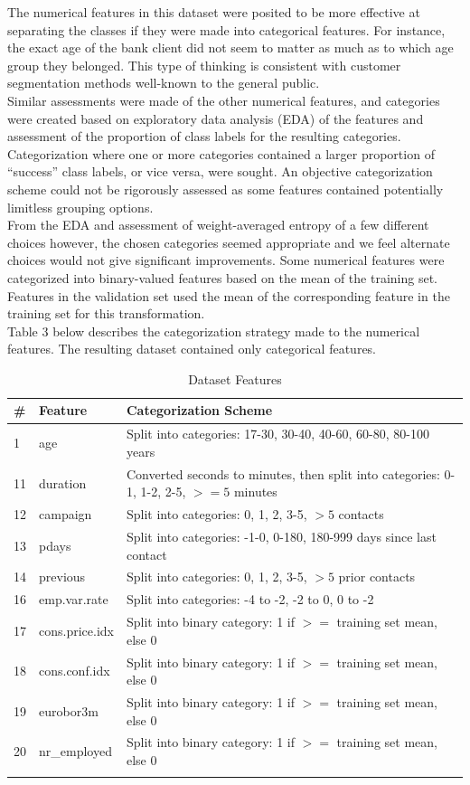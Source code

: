 \documentclass[11pt]{article}
\begin{document}
The numerical features in this dataset were posited to be more effective at separating the classes if they were made into categorical features. For instance, the exact age of the bank client did not seem to matter as much as to which age group they belonged. This type of thinking is consistent with customer segmentation methods well-known to the general public.  \\

Similar assessments were made of the other numerical features, and categories were created based on exploratory data analysis (EDA) of the features and assessment of the proportion of class labels for the resulting categories. Categorization where one or more categories contained a larger proportion of “success” class labels, or vice versa, were sought. An objective categorization scheme could not be rigorously assessed as some features contained potentially limitless grouping options.  \\

From the EDA and assessment of weight-averaged entropy of a few different choices however, the chosen categories seemed appropriate and we feel alternate choices would not give significant improvements. Some numerical features were categorized into binary-valued features based on the mean of the training set. Features in the validation set used the mean of the corresponding feature in the training set for this transformation. \\

Table 3 below describes the categorization strategy made to the numerical features. The resulting dataset contained only categorical features. 

\begin{table}[hbt!]
\centering
\caption{Dataset Features}
\begin{tabular}{lll}
\hline
\textbf{\#}& \textbf{Feature}& \textbf{Categorization Scheme}\\
\hline
1&age&Split into categories: 17-30, 30-40, 40-60, 60-80, 80-100 years \\
11&duration &Converted seconds to minutes, then split into categories: 0-1, 1-2, 2-5, $>=5$ minutes  \\
12&campaign  &Split into categories: 0, 1, 2, 3-5, $>5$ contacts \\
13&pdays &Split into categories: -1-0, 0-180, 180-999 days since last contact \\
14&previous  &Split into categories: 0, 1, 2, 3-5, $>5$ prior contacts \\
16&emp.var.rate &Split into categories: -4 to -2, -2 to 0, 0 to -2 \\
17&cons.price.idx  &Split into binary category: 1 if $>=$ training set mean, else 0 \\
18&cons.conf.idx &Split into binary category: 1 if $>=$  training set mean, else 0 \\
19&eurobor3m  &Split into binary category: 1 if $>=$ training set mean, else 0\\
20&nr\_employed   &Split into binary category: 1 if $>=$ training set mean, else 0\\
\label{tB}
\end{tabular}
\end{table}
\end{document}
